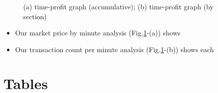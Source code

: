 \documentclass[conference]{IEEEtran}
\begin{document}
\begin{figure}[htbp]
\centering
{}
\caption{(a) time-profit graph (accumulative); (b) time-profit graph (by section)}
\label{fig:profit}
\vspace{-0.5cm}
\end{figure}

\begin{itemize}
\item Our market price by minute analysis (Fig.\ref{fig:profit}-(a)) shows 
\item Our transaction count per minute analysis (Fig.\ref{fig:profit}-(b)) shows each 
\end{itemize}

\section*{Tables}
\end{document}
